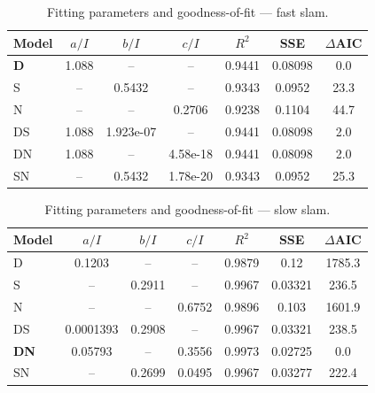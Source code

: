 \begin{table}[h]\centering
\caption{Fitting parameters and goodness-of-fit --- fast slam.}
\label{tab:fits_fast}
\begin{tabular}{lcccccc}
\toprule
Model & $a/I$ & $b/I$ & $c/I$ & $R^2$ & SSE & $\Delta$AIC \\
\midrule
\textbf{D} & 1.088 & -- & -- & 0.9441 & 0.08098 & 0.0 \\
S & -- & 0.5432 & -- & 0.9343 & 0.0952 & 23.3 \\
N & -- & -- & 0.2706 & 0.9238 & 0.1104 & 44.7 \\
DS & 1.088 & 1.923e-07 & -- & 0.9441 & 0.08098 & 2.0 \\
DN & 1.088 & -- & 4.58e-18 & 0.9441 & 0.08098 & 2.0 \\
SN & -- & 0.5432 & 1.78e-20 & 0.9343 & 0.0952 & 25.3 \\
\bottomrule
\end{tabular}
\end{table}

\begin{table}[h]\centering
\caption{Fitting parameters and goodness-of-fit --- slow slam.}
\label{tab:fits_slow}
\begin{tabular}{lcccccc}
\toprule
Model & $a/I$ & $b/I$ & $c/I$ & $R^2$ & SSE & $\Delta$AIC \\
\midrule
D & 0.1203 & -- & -- & 0.9879 & 0.12 & 1785.3 \\
S & -- & 0.2911 & -- & 0.9967 & 0.03321 & 236.5 \\
N & -- & -- & 0.6752 & 0.9896 & 0.103 & 1601.9 \\
DS & 0.0001393 & 0.2908 & -- & 0.9967 & 0.03321 & 238.5 \\
\textbf{DN} & 0.05793 & -- & 0.3556 & 0.9973 & 0.02725 & 0.0 \\
SN & -- & 0.2699 & 0.0495 & 0.9967 & 0.03277 & 222.4 \\
\bottomrule
\end{tabular}
\end{table}

